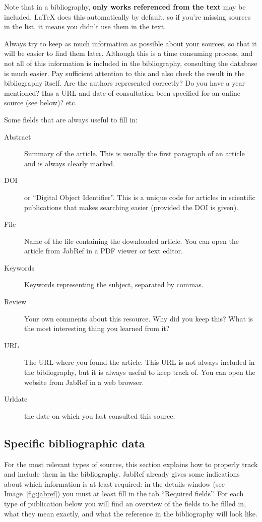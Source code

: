 Note that in a bibliography, \textbf{only works referenced from the text} may be included. {\LaTeX} does this automatically by default, so if you're missing sources in the list, it means you didn't use them in the text.

Always try to keep as much information as possible about your sources, so that it will be easier to find them later. Although this is a time consuming process, and not all of this information is included in the bibliography, consulting the database is much easier. Pay sufficient attention to this and also check the result in the bibliography itself. Are the authors represented correctly? Do you have a year mentioned? Has a URL and date of consultation been specified for an online source (see below)? etc.

Some fields that are always useful to fill in:

\begin{description}
  \item[Abstract] Summary of the article. This is usually the first paragraph of an article and is always clearly marked.
  \item[DOI] or ``Digital Object Identifier''. This is a unique code for articles in scientific publications that makes searching easier (provided the DOI is given).
  \item[File] Name of the file containing the downloaded article. You can open the article from JabRef in a PDF viewer or text editor.
  \item[Keywords] Keywords representing the subject, separated by commas.
  \item[Review] Your own comments about this resource. Why did you keep this? What is the most interesting thing you learned from it?
  \item[URL] The URL where you found the article. This URL is not always included in the bibliography, but it is always useful to keep track of. You can open the website from JabRef in a web browser.
  \item[Urldate] the date on which you last consulted this source.
\end{description}

\subsection{Specific bibliographic data}
\label{sub:specific_bibliographic_data}

For the most relevant types of sources, this section explains how to properly track and include them in the bibliography. JabRef already gives some indications about which information is at least required: in the details window (see Image~\ref{fig:jabref}) you must at least fill in the tab ``Required fields''. For each type of publication below you will find an overview of the fields to be filled in, what they mean exactly, and what the reference in the bibliography will look like.

